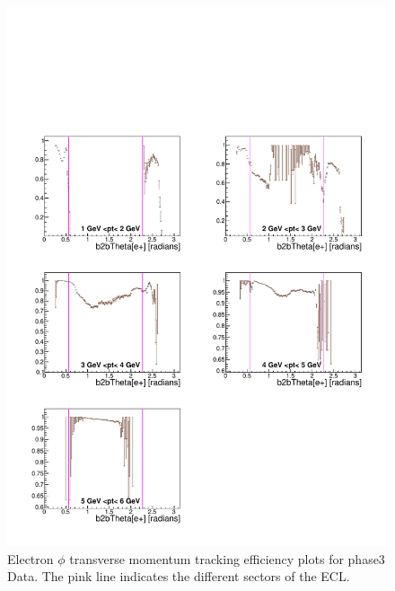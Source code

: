 \documentclass[a4paper,11pt,twosided,final,german,openbib,pdftex,listof=totoc,bibliography=totoc]{scrbook}
\begin{document}
\begin{appendix}
\begin{figure}[!htbp]
	\centering
	\includegraphics[width=\textwidth]{Plots/master3/xPtMThetaem_DataP3}
	\caption[Transverse Momentum $\theta$ Electron Efficiency Phase3 Data]{Electron $\phi$ transverse momentum tracking efficiency plots for phase3 Data. The pink line indicates the different sectors of the ECL.}
	\label{plt:PtMThetaem3_Data}
\end{figure}



\end{appendix}
\end{document}
